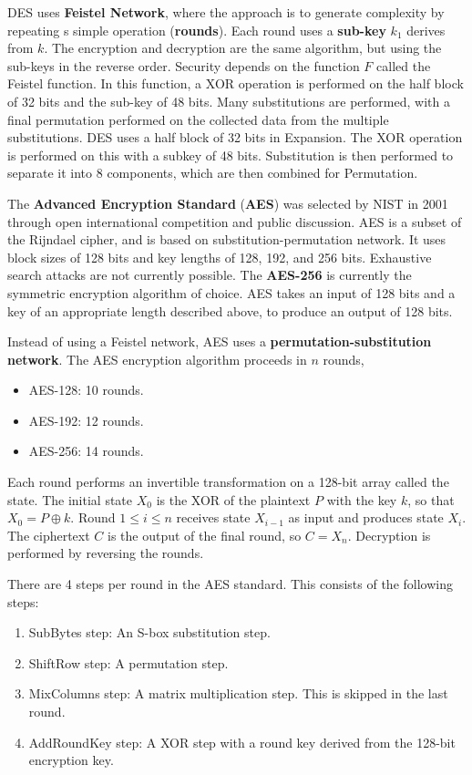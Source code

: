 \documentclass[11pt]{article}
\theoremstyle{plain} %
\theoremstyle{definition}
\theoremstyle{example}
\theoremstyle{remark}
\begin{document}
DES uses \textbf{Feistel Network}, where the approach is to generate complexity by repeating s simple operation (\textbf{rounds}). Each round uses a \textbf{sub-key} $k_1$ derives from $k$. The encryption and decryption are the same algorithm, but using the sub-keys in the reverse order. Security depends on the function $F$ called the Feistel function. In this function, a XOR operation is performed on the half block of 32 bits and the sub-key of 48 bits. Many substitutions are performed, with a final permutation performed on the collected data from the multiple substitutions. DES uses a half block of 32 bits in Expansion. The XOR operation is performed on this with a subkey of 48 bits. Substitution is then performed to separate it into 8 components, which are then combined for Permutation. 

The \textbf{Advanced Encryption Standard} (\textbf{AES}) was selected by NIST in 2001 through open international competition and public discussion. AES is a subset of the Rijndael cipher, and is based on substitution-permutation network. It uses block sizes of 128 bits and key lengths of 128, 192, and 256 bits. Exhaustive search attacks are not currently possible. The \textbf{AES-256} is currently the symmetric encryption algorithm of choice. AES takes an input of 128 bits and a key of an appropriate length described above, to produce an output of 128 bits. 

Instead of using a Feistel network, AES uses a \textbf{permutation-substitution network}. The AES encryption algorithm proceeds in $n$ rounds, 
\begin{itemize}
	\item AES-128: 10 rounds.
	\item AES-192: 12 rounds.
	\item AES-256: 14 rounds.
\end{itemize}
Each round performs an invertible transformation on a 128-bit array called the state. The initial state $X_0$ is the XOR of the plaintext $P$ with the key $k$, so that 
$X_0 = P \oplus k.$
Round $1 \leq i \leq n$ receives state $X_{i-1}$ as input and produces state $X_i$. The ciphertext $C$ is the output of the final round, so 
$C = X_n$.
Decryption is performed by reversing the rounds. 

There are 4 steps per round in the AES standard. This consists of the following steps:
\begin{enumerate}
	\item SubBytes step: An S-box substitution step.
	\item ShiftRow step: A permutation step.
	\item MixColumns step: A matrix multiplication step. This is skipped in the last round.
	\item AddRoundKey step: A XOR step with a round key derived from the 128-bit encryption key.
\end{enumerate}
\end{document}
